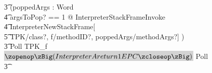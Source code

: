 \begin{figure}[tp!]
\begin{circusaction}
    \t3 (\circvar poppedArgs : \seq Word \circspot \\
    \t4 \lschexpract \exists argsToPop? == 1 @ InterpreterStackFrameInvoke \rschexpract \circseq \\
    \t4 \lschexpract InterpreterNewStackFrame[\\
    \t5 TPK/class?, f/methodID?, poppedArgs/methodArgs?] \rschexpract) \circseq \\
    \t3 Poll \circseq TPK\_f \circseq \colorbox{lightgray}{$\lschexpract InterpreterAreturn1EPC \rschexpract$} \circseq Poll \circseq \\
    \t3 {} \cdots {} \\

\end{circusaction}
\end{figure}
